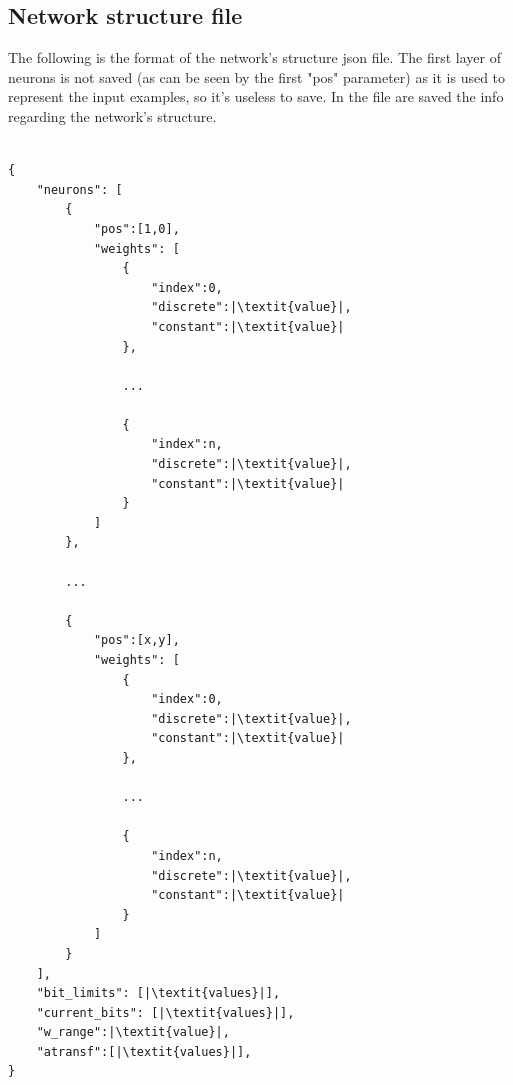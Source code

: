 \documentclass{article}
\begin{document}
\newpage
\subsection{Network structure file}
The following is the format of the network's structure json file. The first layer of neurons is not saved (as can be seen by the first "pos" parameter) as it is used to represent the input examples, so it's useless to save. In the file are saved the info regarding the network's structure.
\begin{lstlisting}[escapechar=|]

{
    "neurons": [
        {
            "pos":[1,0],
            "weights": [
                {
                    "index":0,
                    "discrete":|\textit{value}|,
                    "constant":|\textit{value}|
                },
                
                ...
                
                {
                    "index":n,
                    "discrete":|\textit{value}|,
                    "constant":|\textit{value}|
                }
            ]
        },

        ...
        
        {
            "pos":[x,y],
            "weights": [
                {
                    "index":0,
                    "discrete":|\textit{value}|,
                    "constant":|\textit{value}|
                },

                ...
                
                {
                    "index":n,
                    "discrete":|\textit{value}|,
                    "constant":|\textit{value}|
                }
            ]
        }
    ],
    "bit_limits": [|\textit{values}|],
    "current_bits": [|\textit{values}|],
    "w_range":|\textit{value}|,
    "atransf":[|\textit{values}|],
}
\end{lstlisting}
\end{document}
